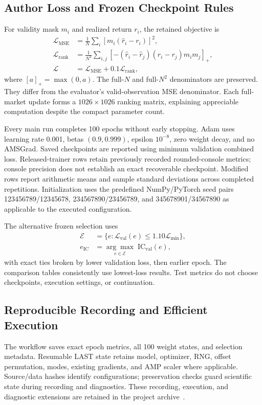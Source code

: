 \documentclass[conference]{IEEEtran}
\begin{document}
\subsection{Author Loss and Frozen Checkpoint Rules}
For validity mask $m_i$ and realized return $r_i$, the retained objective is
\begin{align}
\mathcal L_{\mathrm{MSE}}&=\frac{1}{N}\sum_i[m_i(\hat r_i-r_i)]^2,\\
\mathcal L_{\mathrm{rank}}&=\frac{1}{N^2}\sum_{i,j}
\left[-(\hat r_i-\hat r_j)(r_i-r_j)m_i m_j\right]_+,\\
\mathcal L&=\mathcal L_{\mathrm{MSE}}+0.1\mathcal L_{\mathrm{rank}},
\label{eq:loss}
\end{align}
where $[a]_+=\max(0,a)$. The full-$N$ and full-$N^2$ denominators are preserved. They differ from the evaluator's valid-observation MSE denominator. Each full-market update forms a $1026\times1026$ ranking matrix, explaining appreciable computation despite the compact parameter count.

Every main run completes 100 epochs without early stopping. Adam uses learning rate 0.001, betas $(0.9,0.999)$, epsilon $10^{-8}$, zero weight decay, and no AMSGrad. Saved checkpoints are reported using minimum validation combined loss. Released-trainer rows retain previously recorded rounded-console metrics; console precision does not establish an exact recoverable checkpoint. Modified rows report arithmetic means and sample standard deviations across completed repetitions. Initialization uses the predefined NumPy/PyTorch seed pairs 123456789/12345678, 234567890/23456789, and 345678901/34567890 as applicable to the executed configuration.

The alternative frozen selection uses
\begin{align}
\mathcal E&=\{e:\mathcal L_{\mathrm{val}}(e)\leq1.10\mathcal L_{\min}\},\\
e_{\mathrm{IC}}&=\underset{e\in\mathcal E}{\arg\max}\;\mathrm{IC}_{\mathrm{val}}(e),
\label{eq:selection}
\end{align}
with exact ties broken by lower validation loss, then earlier epoch. The comparison tables consistently use lowest-loss results. Test metrics do not choose checkpoints, execution settings, or continuation.

\subsection{Reproducible Recording and Efficient Execution}
The workflow saves exact epoch metrics, all 100 weight states, and selection metadata. Resumable LAST state retains model, optimizer, RNG, offset permutation, modes, existing gradients, and AMP scaler where applicable. Source/data hashes identify configurations; preservation checks guard scientific state during recording and diagnostics. These recording, execution, and diagnostic extensions are retained in the project archive~\cite{project}.
\end{document}
